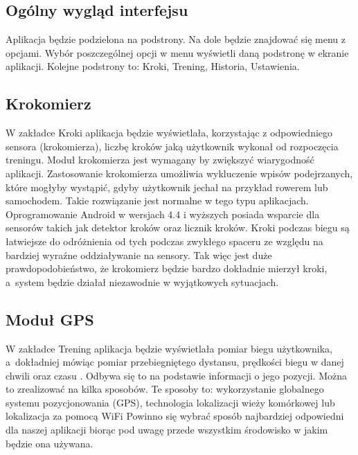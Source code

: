 \subsection{Ogólny wygląd interfejsu}  %

\hspace{0.60cm}Aplikacja będzie podzielona na podstrony. Na dole będzie znajdować się menu z opcjami. Wybór poszczególnej opcji w menu wyświetli daną podstronę w ekranie aplikacji. Kolejne podstrony to: Kroki, Trening, Historia, Ustawienia.

\subsection{Krokomierz}  %

\hspace{0.60cm}W zakładce Kroki aplikacja będzie wyświetlała, korzystając z odpowiedniego sensora (krokomierza), liczbę kroków jaką użytkownik wykonał od rozpoczęcia treningu. Moduł krokomierza jest wymagany by zwiększyć wiarygodność aplikacji. Zastosowanie krokomierza umożliwia wykluczenie wpisów podejrzanych, które mogłyby wystąpić, gdyby użytkownik jechał na przykład rowerem lub samochodem. Takie rozwiązanie jest normalne w tego typu aplikacjach. Oprogramowanie Android w wersjach 4.4 i wyższych posiada wsparcie dla sensorów takich jak detektor kroków oraz licznik kroków. Kroki podczas biegu są łatwiejsze do odróżnienia od tych podczas zwykłego spaceru ze względu na bardziej wyraźne oddziaływanie na sensory. Tak więc jest duże prawdopodobieństwo, że krokomierz będzie bardzo dokładnie mierzył kroki, a~system będzie działał niezawodnie w wyjątkowych sytuacjach.

\subsection{Moduł GPS}  %

\hspace{0.60cm}W zakładce Trening aplikacja będzie wyświetlała pomiar biegu użytkownika, a~dokładniej mówiąc pomiar przebiegniętego dystansu, prędkości biegu w danej chwili oraz czasu . Odbywa się to na podstawie informacji o jego pozycji. Można to zrealizować na kilka sposobów. Te sposoby to: wykorzystanie globalnego systemu pozycjonowania (GPS), technologia lokalizacji wieży komórkowej lub lokalizacja za pomocą WiFi Powinno się wybrać sposób najbardziej odpowiedni dla naszej aplikacji biorąc pod uwagę przede wszystkim środowisko w jakim będzie ona używana.
 
